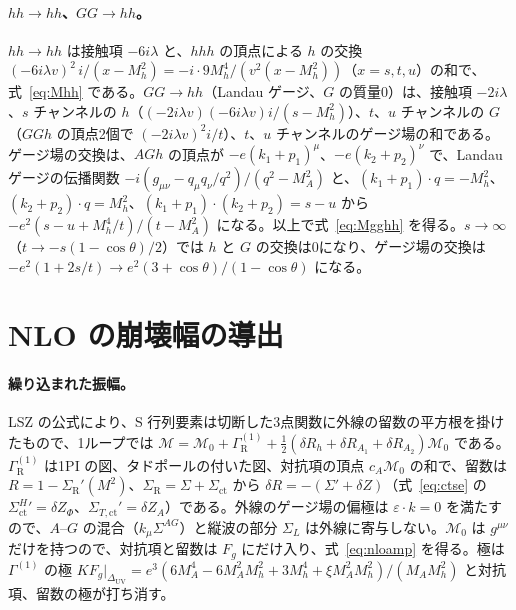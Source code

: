 \documentclass[a4paper,10pt]{ltjsarticle}
\newcommand{\DUV}{\Delta_{\mathrm{UV}}}
\begin{document}
\paragraph{$hh\to hh$、$GG\to hh$。}$hh\to hh$ は接触項 $-6i\lambda$ と、$hhh$ の頂点による $h$ の交換 $(-6i\lambda v)^2\,i/(x-M_h^2)=-i\cdot9M_h^4/(v^2(x-M_h^2))$（$x=s,t,u$）の和で、式~\eqref{eq:Mhh} である。$GG\to hh$（Landau ゲージ、$G$ の質量0）は、接触項 $-2i\lambda$、$s$ チャンネルの $h$（$(-2i\lambda v)(-6i\lambda v)i/(s-M_h^2)$）、$t$、$u$ チャンネルの $G$（$GGh$ の頂点2個で $(-2i\lambda v)^2i/t$）、$t$、$u$ チャンネルのゲージ場の和である。ゲージ場の交換は、$AGh$ の頂点が $-e(k_1+p_1)^\mu$、$-e(k_2+p_2)^\nu$ で、Landau ゲージの伝播関数 $-i(g_{\mu\nu}-q_\mu q_\nu/q^2)/(q^2-M_A^2)$ と、$(k_1+p_1)\cdot q=-M_h^2$、$(k_2+p_2)\cdot q=M_h^2$、$(k_1+p_1)\cdot(k_2+p_2)=s-u$ から $-e^2(s-u+M_h^4/t)/(t-M_A^2)$ になる。以上で式~\eqref{eq:Mgghh} を得る。$s\to\infty$（$t\to-s(1-\cos\theta)/2$）では $h$ と $G$ の交換は0になり、ゲージ場の交換は $-e^2(1+2s/t)\to e^2(3+\cos\theta)/(1-\cos\theta)$ になる。

\section{NLO の崩壊幅の導出}\label{app:nlo}

\paragraph{繰り込まれた振幅。}LSZ の公式により、S 行列要素は切断した3点関数に外線の留数の平方根を掛けたもので、1ループでは $\mathcal M=\mathcal M_0+\Gamma^{(1)}_{\mathrm R}+\frac12(\delta R_h+\delta R_{A_1}+\delta R_{A_2})\mathcal M_0$ である。$\Gamma^{(1)}_{\mathrm R}$ は1PI の図、タドポールの付いた図、対抗項の頂点 $c_A\mathcal M_0$ の和で、留数は $R=1-\Sigma_{\mathrm R}'(M^2)$、$\Sigma_{\mathrm R}=\Sigma+\Sigma_{\mathrm{ct}}$ から $\delta R=-(\Sigma'+\delta Z)$（式~\eqref{eq:ctse} の $\Sigma^H_{\mathrm{ct}}{}'=\delta Z_\Phi$、$\Sigma_{T,\mathrm{ct}}'=\delta Z_A$）である。外線のゲージ場の偏極は $\varepsilon\cdot k=0$ を満たすので、$A$--$G$ の混合（$k_\mu\Sigma^{AG}$）と縦波の部分 $\Sigma_L$ は外線に寄与しない。$\mathcal M_0$ は $g^{\mu\nu}$ だけを持つので、対抗項と留数は $F_g$ にだけ入り、式~\eqref{eq:nloamp} を得る。極は $\Gamma^{(1)}$ の極 $K F_g|_{\DUV}=e^3(6M_A^4-6M_A^2M_h^2+3M_h^4+\xi M_A^2M_h^2)/(M_AM_h^2)$ と対抗項、留数の極が打ち消す。
\end{document}
